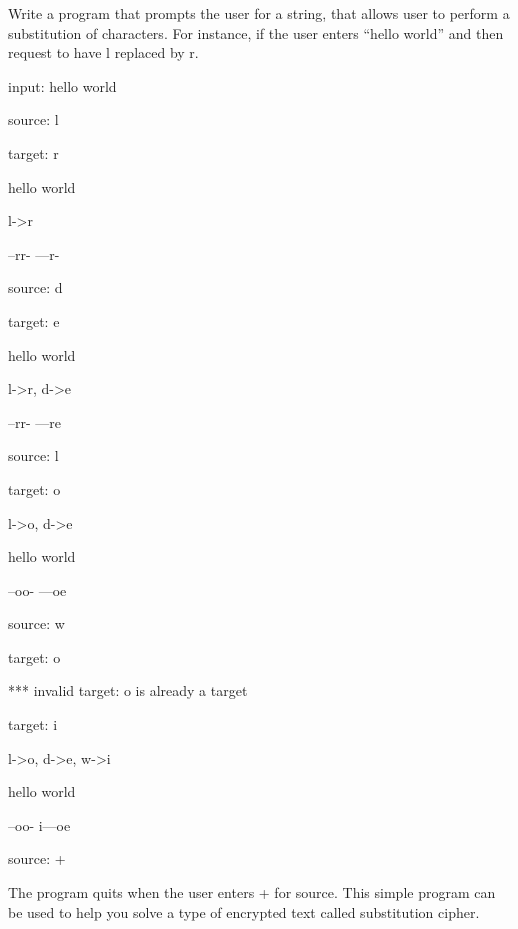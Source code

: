 Write a program that prompts the user for a string, that allows user to perform a substitution of characters. For instance, if the user enters ``hello world'' and then request to have l replaced by r.



\begin{consolethree}[escapeinside=||]

input: hello world

source: l

target: r



hello world

l->r

--rr- ---r-



source: d

target: e

hello world

l->r, d->e

--rr- ---re



source: l

target: o

l->o, d->e

hello world

--oo- ---oe



source: w

target: o

*** invalid target: o is already a target

target: i

l->o, d->e, w->i

hello world

--oo- i---oe



source: +

\end{consolethree}



The program quits when the user enters + for source. This simple program can be used to help you solve a type of encrypted text called substitution cipher.

